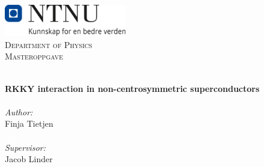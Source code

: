 
\begin{titlepage}
\vbox{ }
\vbox{ }
\begin{center}
\includegraphics[width=0.40\textwidth]{Images/NTNU_logo.png}\\[1cm]
\textsc{\LARGE Department of Physics}\\[1.5cm]
\textsc{\Large Masteroppgave}\\[0.5cm]
\vbox{ }

\HRule \\[0.4cm]
{ \huge \bfseries RKKY interaction in non-centrosymmetric superconductors}\\[0.4cm]
\HRule \\[1.5cm]

\large
\emph{Author:}\\
Finja Tietjen \\
\textcolor{white}{space}\\
\large
\emph{Supervisor:}\\
Jacob Linder
\vfill

\end{center}
\end{titlepage}
